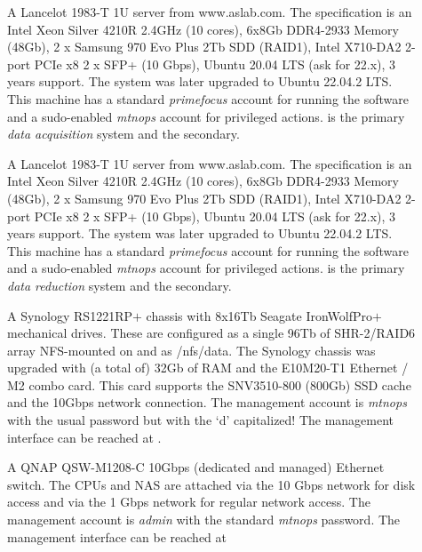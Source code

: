 \documentclass[12pt,twoside]{article}
\begin{document}
\begin{description}
\item[] A Lancelot 1983-T 1U server from www.aslab.com. The specification is an
              Intel Xeon Silver 4210R 2.4GHz (10 cores), 6x8Gb DDR4-2933 Memory (48Gb),
              2 x Samsung 970 Evo Plus 2Tb SDD (RAID1), Intel X710-DA2 2-port PCIe x8 2 x SFP+ (10 Gbps),
              Ubuntu 20.04 LTS (ask for 22.x), 3 years support. The system was later upgraded to Ubuntu 22.04.2 LTS.
              This machine has a standard \emph{primefocus} account for running the software and a sudo-enabled \emph{mtnops}
              account for privileged actions.
               is the primary \emph{data acquisition} system and  the secondary.
\item[] A Lancelot 1983-T 1U server from www.aslab.com. The specification is an
              Intel Xeon Silver 4210R 2.4GHz (10 cores), 6x8Gb DDR4-2933 Memory (48Gb),
              2 x Samsung 970 Evo Plus 2Tb SDD (RAID1), Intel X710-DA2 2-port PCIe x8 2 x SFP+ (10 Gbps),
              Ubuntu 20.04 LTS (ask for 22.x), 3 years support. The system was later upgraded to Ubuntu 22.04.2 LTS.
              This machine has a standard \emph{primefocus} account for running the software and a sudo-enabled \emph{mtnops}
              account for privileged actions.
               is the primary \emph{data reduction} system and  the secondary.
\item[] A Synology RS1221RP$+$ chassis with 8x16Tb Seagate IronWolfPro$+$ mechanical drives. These are
              configured as a single 96Tb of SHR-2/RAID6 array NFS-mounted on  and  as 
              /nfs/data. The Synology chassis was upgraded with (a total of) 32Gb of RAM and the E10M20-T1
              Ethernet / M2 combo card. This card supports the SNV3510-800 (800Gb) SSD cache and the 10Gbps
              network connection. The management account is \emph{mtnops} with the usual password but with the `d' capitalized!
              The management interface can be reached at .
\item[] A QNAP QSW-M1208-C 10Gbps (dedicated and managed) Ethernet switch. The CPUs and NAS are attached
              via the 10 Gbps network for disk access and via the 1 Gbps network for regular network access. The management
              account is \emph{admin} with the standard \emph{mtnops} password. The management interface can be reached at

\end{description}
\end{document}
